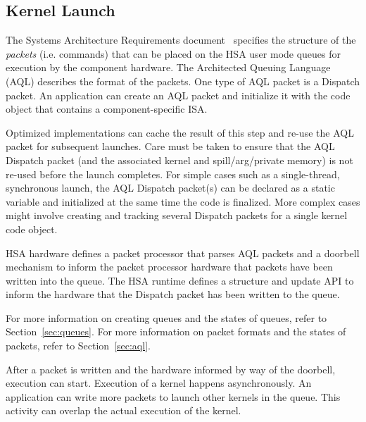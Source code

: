 \documentclass[final]{book}
\begin{document}
\subsection{Kernel Launch}
The Systems Architecture Requirements document~\cite{sar} specifies the
structure of the \emph{packets} (i.e. commands) that can be placed on the HSA
user mode queues for execution by the component hardware. The Architected
Queuing Language (AQL) describes the format of the packets. One type of
AQL packet is a Dispatch packet. An application can create an AQL packet
and initialize it with the code object that contains a component-specific ISA.

Optimized implementations can cache the result of this step and re-use the AQL
packet for subsequent launches. Care must be taken to ensure that the AQL
Dispatch packet (and the associated kernel and spill/arg/private memory) is not
re-used before the launch completes. For simple cases such as a
single-thread, synchronous launch, the AQL Dispatch packet(s) can be declared
as a static variable and initialized at the same time the code is
finalized. More complex cases might involve creating and tracking several
Dispatch packets for a single kernel code object.

HSA hardware defines a packet processor that parses AQL packets and a
doorbell mechanism to inform the packet processor hardware that packets have
been written into the queue. The HSA runtime defines a structure and update API
to inform the hardware that the Dispatch packet has been written to the queue.

For more information on creating queues and the states of queues, refer to
Section~\ref{sec:queues}. For more information on packet formats and the states
of packets, refer to Section~\ref{sec:aql}.

After a packet is written and the hardware informed by way of the doorbell,
execution can start. Execution of a kernel happens asynchronously. An application
can write more packets to launch other kernels in the queue. This activity can
overlap the actual execution of the kernel.
\end{document}
